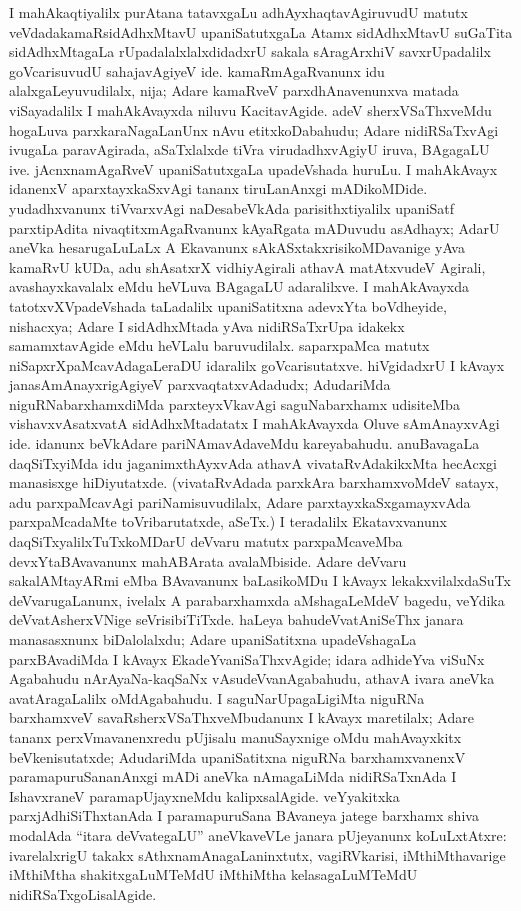 I mahAkaqtiyalilx purAtana tatavxgaLu adhAyxhaqtavAgiruvudU matutx veVdada\break kamaRsidAdhxMtavU upaniSatutxgaLa Atamx sidAdhxMtavU suGaTita sidAdhxMtagaLa rUpa\-dalalxlalxdidadxrU sakala sAragArxhiV savxrUpadalilx goVcarisuvudU sahajavAgiyeV ide. kamaRmAgaRvanunx idu alalxgaLeyuvudilalx, nija; Adare kamaRveV parxdhAnavenunxva matada viSayadalilx I mahAkAvayxda niluvu KacitavAgide. adeV sherxVSaThxveMdu hogaLuva parxkaraNagaLanUnx nAvu etitxkoDabahudu; Adare nidiRSaTxvAgi ivugaLa paravAgirada, aSaTxlalxde tiVra virudadhxvAgiyU iruva, BAgagaLU ive. jAcnxnamAgaRveV upaniSatutxgaLa upadeVshada huruLu. I mahAkAvayx idanenxV aparxtayxkaSxvAgi tananx tiruLanAnxgi mADikoMDide. yudadhxvanunx tiVvarxvAgi naDesabeVkAda parisithxtiyalilx upaniSatf parxtipAdita nivaqtitxmAgaRvanunx kAyaRgata mADuvudu asAdhayx; AdarU aneVka hesarugaLuLaLx A Ekavanunx sAkASxtakxrisikoMDavanige yAva kamaRvU kUDa, adu shAsatxrX vidhiyAgirali athavA matAtxvudeV Agirali, avashayxkavalalx eMdu heVLuva BAgagaLU adaralilxve. I mahAkAvayxda tatotxvXVpadeVshada taLadalilx upaniSatitxna adevxYta boVdheyide, nishacxya; Adare I sidAdhxMtada yAva nidiRSaTxrUpa idakekx samamxtavAgide eMdu heVLalu baruvudilalx. saparxpaMca matutx niSapxrXpaMcavAdagaLeraDU idaralilx goVcarisutatxve. hiVgidadxrU I kAvayx janasAmAnayxrigAgiyeV parxvaqtatxvAdadudx; AdudariMda niguRNabarxhamxdiMda parxteyxVkavAgi saguNabarxhamx udisiteMba vishavxvAsatxvatA sidAdhxMtadatatx I mahAkAvayxda Oluve sAmAnayxvAgi ide. idanunx beVkAdare pariNAmavAdaveMdu kareyabahudu. anuBavagaLa daqSiTxyiMda idu jaganimxthAyxvAda athavA vivataRvAdakikxMta hecAcxgi manasisxge hiDiyutatxde. (vivataRvAdada parxkAra barxhamxvoMdeV satayx, adu parxpaMcavAgi pariNamisuvudilalx, Adare parxtayxkaSxgamayxvAda parxpaMcadaMte toVribarutatxde, aSeTx.) I teradalilx Ekatavxvanunx daqSiTxyalilxTuTxkoMDarU deVvaru matutx parxpaMcaveMba devxYtaBAvavanunx mahABArata avalaMbiside. Adare deVvaru sakalAMtayARmi eMba BAvavanunx baLasikoMDu I kAvayx lekakxvilalxdaSuTx deVvarugaLanunx, ivelalx A parabarxhamxda aMshagaLeMdeV bagedu, veYdika deVvatAsherxVNige seVrisibiTiTxde. haLeya bahudeVvatAniSeThx janara manasasxnunx biDalolalxdu; Adare upaniSatitxna upadeVshagaLa parxBAvadiMda I kAvayx EkadeYvaniSaThxvAgide; idara adhideYva viSuNx Agabahudu nArAyaNa-kaqSaNx vAsudeVvanAgabahudu, athavA ivara aneVka avatAragaLalilx oMdAgabahudu. I saguNarUpagaLigiMta niguRNa barxhamxveV savaRsherxVSaThxveMbudanunx I kAvayx maretilalx; Adare tananx perxVmavanenxredu pUjisalu manuSayxnige oMdu mahAvayxkitx beVkenisutatxde; AdudariMda upaniSatitxna niguRNa barxhamxvanenxV paramapuruSananAnxgi mADi aneVka nAmagaLiMda nidiRSaTxnAda I IshavxraneV paramapUjayxneMdu kalipxsalAgide. veYyakitxka parxjAdhiSiThxtanAda I paramapuruSana BAvaneya jatege barxhamx shiva modalAda ``itara deVvategaLU'' aneVkaveVLe janara pUjeyanunx koLuLxtAtxre: ivarelalxrigU takakx sAthxnamAnagaLaninxtutx, vagiRVkarisi, iMthiMthavarige iMthiMtha shakitxgaLuMTeMdU iMthiMtha kelasagaLuMTeMdU nidiRSaTxgoLisalAgide.

